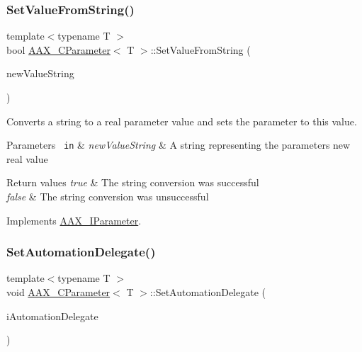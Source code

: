 \subsubsection{\texorpdfstring{SetValueFromString()}{SetValueFromString()}}
{\footnotesize\ttfamily template$<$typename T $>$ \\
bool \mbox{\hyperlink{a01537}{A\+A\+X\+\_\+\+C\+Parameter}}$<$ T $>$\+::Set\+Value\+From\+String (\begin{DoxyParamCaption}\item[{const \mbox{\hyperlink{a01573}{A\+A\+X\+\_\+\+C\+String}} \&}]{new\+Value\+String }\end{DoxyParamCaption})\hspace{0.3cm}{\ttfamily [virtual]}}



Converts a string to a real parameter value and sets the parameter to this value. 


\begin{DoxyParams}[1]{Parameters}
\mbox{\texttt{ in}}  & {\em new\+Value\+String} & A string representing the parameter\textquotesingle{}s new real value\\
\hline
\end{DoxyParams}

\begin{DoxyRetVals}{Return values}
{\em true} & The string conversion was successful \\
\hline
{\em false} & The string conversion was unsuccessful \\
\hline
\end{DoxyRetVals}


Implements \mbox{\hyperlink{a01857_ae4caa85ca368e684f813147443bdde55}{A\+A\+X\+\_\+\+I\+Parameter}}.

\mbox{\label{a01537_aceb34aeadaca054f318004d49a0bd5b7}} 
\subsubsection{\texorpdfstring{SetAutomationDelegate()}{SetAutomationDelegate()}}
{\footnotesize\ttfamily template$<$typename T $>$ \\
void \mbox{\hyperlink{a01537}{A\+A\+X\+\_\+\+C\+Parameter}}$<$ T $>$\+::Set\+Automation\+Delegate (\begin{DoxyParamCaption}\item[{\mbox{\hyperlink{a01773}{A\+A\+X\+\_\+\+I\+Automation\+Delegate}} $\ast$}]{i\+Automation\+Delegate }\end{DoxyParamCaption})\hspace{0.3cm}{\ttfamily [virtual]}}




